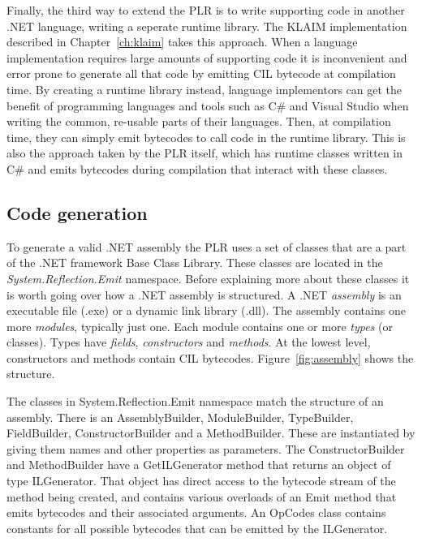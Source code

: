 	Finally, the third way to extend the PLR is to write supporting code in
	another .NET language, writing a seperate runtime library. The KLAIM implementation
	described in Chapter~\ref{ch:klaim} takes this approach. When a language
	implementation requires large amounts of supporting code it is inconvenient
	and error prone to generate all that code by emitting CIL bytecode at 
	compilation time. By creating a runtime library instead, language implementors 
	can get the benefit of programming languages and tools such as C\# and Visual 
	Studio when writing the common, re-usable parts of their languages. Then, at
	compilation time, they can simply emit bytecodes to call code in the runtime
	library. This is also the approach taken by the PLR itself, which has runtime
	classes written in C\# and emits bytecodes during compilation that interact
	with these classes.	

\subsection{Code generation}
	
	To generate a valid .NET assembly the PLR uses a set of classes that are a 
	part of the .NET framework Base Class Library. These classes are located in 
	the \textit{System.Reflection.Emit} namespace. Before explaining more about 
	these classes it is worth going over how a .NET assembly is structured. A 
	.NET \textit{assembly} is an executable file (.exe) or a dynamic link 
	library (.dll). The assembly contains one more \textit{modules}, typically 
	just one. Each module contains one or more \textit{types} (or classes). 
	Types have \textit{fields}, \textit{constructors} and \textit{methods}. At 
	the lowest level, constructors and methods contain CIL bytecodes. 
	Figure~\ref{fig:assembly} shows the structure.
	
	
	The classes in System.Reflection.Emit namespace match the structure of an 
	assembly. There is an \textsf{AssemblyBuilder}, \textsf{ModuleBuilder}, 
	\textsf{TypeBuilder}, \textsf{FieldBuilder}, \textsf{ConstructorBuilder} and 
	a \textsf{MethodBuilder}. These are instantiated by giving them names and 
	other properties as parameters. The \textsf{ConstructorBuilder} and 
	\textsf{MethodBuilder} have a \textsf{GetILGenerator} method that returns an 
	object of type \textsf{ILGenerator}. That object has direct access to the 
	bytecode stream of the method being created, and contains various overloads 
	of an \textsf{Emit} method that emits bytecodes and their associated 
	arguments. An \textsf{OpCodes} class contains constants for all possible 
	bytecodes that can be emitted by the \textsf{ILGenerator}.
	
